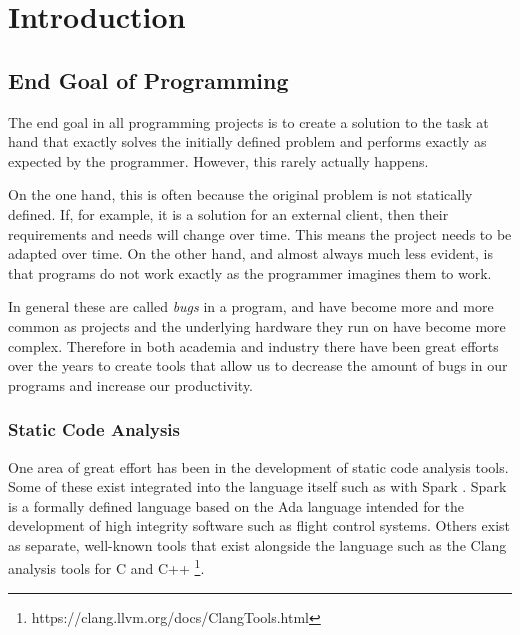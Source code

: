 \documentclass{l4proj}
\begin{document}

\tableofcontents


\chapter{Introduction}


\section{End Goal of Programming}

The end goal in all programming projects is to create a solution to the task at hand that exactly solves the initially defined problem and performs exactly as expected by the programmer.
However, this rarely actually happens.

On the one hand, this is often because the original problem is not statically defined.
If, for example, it is a solution for an external client, then their requirements and needs will change over time.
This means the project needs to be adapted over time.
On the other hand, and almost always much less evident, is that programs do not work exactly as the programmer imagines them to work.

In general these are called \emph{bugs} in a program, and have become more and more common as projects and the underlying hardware they run on have become more complex.
Therefore in both academia and industry there have been great efforts over the years to create tools that allow us to decrease the amount of bugs in our programs and increase our productivity.

\subsection{Static Code Analysis}

One area of great effort has been in the development of static code analysis tools.
Some of these exist integrated into the language itself such as with Spark \citep{Carre1990}.
Spark is a formally defined language based on the Ada \citep{Ada1979} language intended for the development of high integrity software such as flight control systems.
Others exist as separate, well-known tools that exist alongside the language such as the Clang analysis tools for C and C++ \footnote{https://clang.llvm.org/docs/ClangTools.html}.
\end{document}
